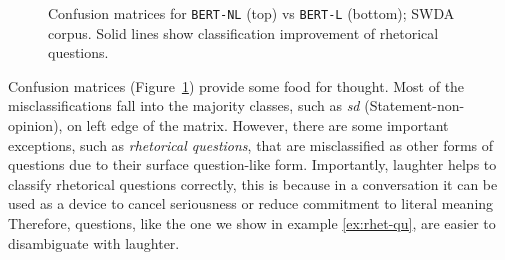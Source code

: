 \documentclass[11pt,a4paper]{article}
\begin{document}
\begin{figure}[h!]
  \caption{Confusion matrices for \texttt{BERT-NL} (top) vs \texttt{BERT-L} (bottom); SWDA corpus. Solid lines show classification improvement  of rhetorical questions.}
    \label{fig:swda-cm}
  \end{figure}


  Confusion matrices (Figure~\ref{fig:swda-cm}) provide some food for
  thought. Most of the misclassifications fall into the majority
  classes, such as \emph{sd} (Statement-non-opinion), on left edge
  of the matrix. However, there are some important exceptions, such as
  \emph{rhetorical questions}, that are misclassified as other forms
  of questions due to their surface question-like form.  Importantly,
  laughter helps to classify rhetorical questions correctly, this is
  because in a conversation it can be used as a device to cancel
  seriousness or reduce commitment to literal meaning %
  \citep{ginzburg2015understanding,tepperman2006yeah} 
  Therefore,
  questions, like the one we show in example \ref{ex:rhet-qu}, are
  easier to disambiguate with laughter.
\end{document}

